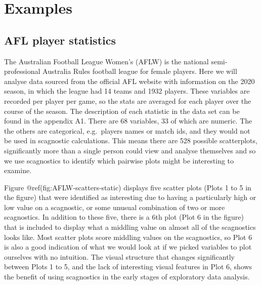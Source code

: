 \hypertarget{examples}{%
\section{Examples}\label{examples}}

\hypertarget{afl-player-statistics}{%
\subsection{AFL player statistics}\label{afl-player-statistics}}

The Australian Football League Women's (AFLW) is the national
semi-professional Australia Rules football league for female players.
Here we will analyse data sourced from the official AFL website with
information on the 2020 season, in which the league had 14 teams and
1932 players. These variables are recorded per player per game, so the
stats are averaged for each player over the course of the season. The
description of each statistic in the data set can be found in the
appendix A1. There are 68 variables, 33 of which are numeric. The the
others are categorical, e.g.~players names or match ids, and they would
not be used in scagnostic calculations. This means there are 528
possible scatterplots, significantly more than a single person could
view and analyse themselves and so we use scagnostics to identify which
pairwise plots might be interesting to examine.

Figure @ref(fig:AFLW-scatters-static) displays five scatter plots (Plots
1 to 5 in the figure) that were identified as interesting due to having
a particularly high or low value on a scagnostic, or some unusual
combination of two or more scagnostics. In addition to these five, there
is a 6th plot (Plot 6 in the figure) that is included to display what a
middling value on almost all of the scagnostics looks like. Most scatter
plots score middling values on the scagnostics, so Plot 6 is also a good
indication of what we would look at if we picked variables to plot
ourselves with no intuition. The visual structure that changes
significantly between Plots 1 to 5, and the lack of interesting visual
features in Plot 6, shows the benefit of using scagnostics in the early
stages of exploratory data analysis.


